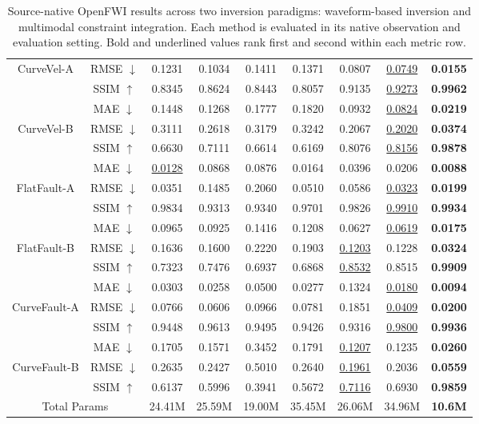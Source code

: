 \begin{table}[H]
\begin{adjustwidth}{0cm}{0cm}
{\begin{tabular}{@{}c c c c c c c c c@{}}
		CurveVel-A & RMSE $\downarrow$ & 0.1231 & 0.1034 & 0.1411 & 0.1371 & 0.0807 & \underline{0.0749} & \textbf{0.0155} \\
		& SSIM $\uparrow$ & 0.8345 & 0.8624 & 0.8443 & 0.8057 & 0.9135 & \underline{0.9273} & \textbf{0.9962} \\
		\addlinespace[2pt]
		& MAE $\downarrow$ & 0.1448 & 0.1268 & 0.1777 & 0.1820 & 0.0932 & \underline{0.0824} & \textbf{0.0219} \\
		CurveVel-B & RMSE $\downarrow$ & 0.3111 & 0.2618 & 0.3179 & 0.3242 & 0.2067 & \underline{0.2020} & \textbf{0.0374} \\
		& SSIM $\uparrow$ & 0.6630 & 0.7111 & 0.6614 & 0.6169 & 0.8076 & \underline{0.8156} & \textbf{0.9878} \\
		\midrule
		& MAE $\downarrow$ & \underline{0.0128} & 0.0868 & 0.0876 & 0.0164 & 0.0396 & 0.0206 & \textbf{0.0088} \\
		FlatFault-A & RMSE $\downarrow$ & 0.0351 & 0.1485 & 0.2060 & 0.0510 & 0.0586 & \underline{0.0323} & \textbf{0.0199} \\
		& SSIM $\uparrow$ & 0.9834 & 0.9313 & 0.9340 & 0.9701 & 0.9826 & \underline{0.9910} & \textbf{0.9934} \\
		\addlinespace[2pt]
		& MAE $\downarrow$ & 0.0965 & 0.0925 & 0.1416 & 0.1208 & 0.0627 & \underline{0.0619} & \textbf{0.0175} \\
		FlatFault-B & RMSE $\downarrow$ & 0.1636 & 0.1600 & 0.2220 & 0.1903 & \underline{0.1203} & 0.1228 & \textbf{0.0324} \\
		& SSIM $\uparrow$ & 0.7323 & 0.7476 & 0.6937 & 0.6868 & \underline{0.8532} & 0.8515 & \textbf{0.9909} \\
		\midrule
		& MAE $\downarrow$ & 0.0303 & 0.0258 & 0.0500 & 0.0277 & 0.1324 & \underline{0.0180} & \textbf{0.0094} \\
		CurveFault-A & RMSE $\downarrow$ & 0.0766 & 0.0606 & 0.0966 & 0.0781 & 0.1851 & \underline{0.0409} & \textbf{0.0200} \\
		& SSIM $\uparrow$ & 0.9448 & 0.9613 & 0.9495 & 0.9426 & 0.9316 & \underline{0.9800} & \textbf{0.9936} \\
		\addlinespace[2pt]
		& MAE $\downarrow$ & 0.1705 & 0.1571 & 0.3452 & 0.1791 & \underline{0.1207} & 0.1235 & \textbf{0.0260} \\
		CurveFault-B & RMSE $\downarrow$ & 0.2635 & 0.2427 & 0.5010 & 0.2640 & \underline{0.1961} & 0.2036 & \textbf{0.0559} \\
		& SSIM $\uparrow$ & 0.6137 & 0.5996 & 0.3941 & 0.5672 & \underline{0.7116} & 0.6930 & \textbf{0.9859} \\
		\midrule
		\multicolumn{2}{c}{Total Params} & 24.41M & 25.59M & 19.00M & 35.45M & 26.06M & 34.96M & \textbf{10.6M} \\
		\bottomrule
	\end{tabular}%
}
	\caption{Source-native OpenFWI results across two inversion paradigms: waveform-based inversion and multimodal constraint integration. Each method is evaluated in its native observation and evaluation setting. Bold and underlined values rank first and second within each metric row.}
	\label{tab:main-comparison}


\end{adjustwidth}
\end{table}
